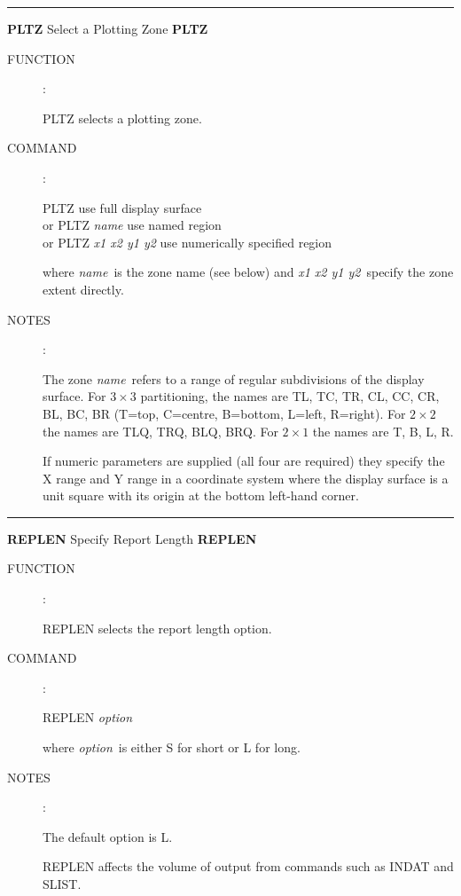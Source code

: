 \goodbreak
\rule{\textwidth}{0.3mm}
{\Large {\bf PLTZ} \hfill Select a Plotting Zone \hfill {\bf PLTZ}}
\begin{description}
\item [FUNCTION]:

PLTZ selects a plotting zone.

\item [COMMAND]:

\begin{cmd}
\> \> PLTZ \> use full display surface \\
\> or \> PLTZ {\it name} \> use named region \\
\> or \> PLTZ {\it x1 x2 y1 y2} \> use numerically specified region
\end{cmd}

where {\it name}\, is the zone name (see below) and {\it x1 x2 y1 y2}\,
specify the zone extent directly.

\item [NOTES]:

The zone {\it name}\, refers to a range of regular subdivisions of
the display surface.  For $3 \times 3$
partitioning, the names are TL, TC, TR,
CL, CC, CR, BL, BC, BR (T=top, C=centre, B=bottom, L=left, R=right).
For $2 \times 2$ the names are TLQ, TRQ, BLQ,
BRQ.  For $2 \times 1$ the names
are T, B, L, R.

If numeric parameters are supplied (all four are required) they
specify the X range and Y range
in a coordinate system where the
display surface is a unit square with its origin at
the bottom left-hand corner.

\end{description}


\goodbreak
\rule{\textwidth}{0.3mm}
{\Large {\bf REPLEN} \hfill Specify Report Length \hfill {\bf REPLEN}}
\begin{description}
\item [FUNCTION]:

REPLEN selects the report length option.

\item [COMMAND]:

\begin{cmd}
\> \> REPLEN {\it option}
\end{cmd}

where {\it option}\, is either S for short or L for long.

\item [NOTES]:

The default option is L.

REPLEN affects the volume of output from commands such as
INDAT and SLIST.

\end{description}

